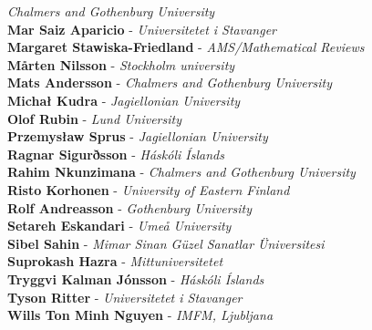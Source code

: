\documentclass[12pt,openany]{report}      %
\begin{document}
\textit{Chalmers and Gothenburg University}
\\
\textbf{Mar Saiz Aparicio} -
\textit{Universitetet i Stavanger}
\\
\textbf{Margaret Stawiska-Friedland} -
\textit{AMS/Mathematical Reviews}
\\
\textbf{Mårten Nilsson} -
\textit{Stockholm university}
\\
\textbf{Mats Andersson} -
\textit{Chalmers and Gothenburg University}
\\
\textbf{Michał Kudra} -
\textit{Jagiellonian University}
\\
\textbf{Olof Rubin} -
\textit{Lund University}
\\
\textbf{Przemysław Sprus} -
\textit{Jagiellonian University}
\\
\textbf{Ragnar Sigurðsson} -
\textit{Háskóli Íslands}
\\
\textbf{Rahim Nkunzimana} -
\textit{Chalmers and Gothenburg University}
\\
\textbf{Risto Korhonen} -
\textit{University of Eastern Finland}
\\
\textbf{Rolf Andreasson} -
\textit{Gothenburg University}
\\
\textbf{Setareh Eskandari} -
\textit{Umeå University}
\\
\textbf{Sibel Sahin} -
\textit{Mimar Sinan Güzel Sanatlar Üniversitesi}
\\
\textbf{Suprokash Hazra} -
\textit{Mittuniversitetet}
\\
\textbf{Tryggvi Kalman Jónsson} -
\textit{Háskóli Íslands}
\\
\textbf{Tyson Ritter} -
\textit{Universitetet i Stavanger}
\\
\textbf{Wills Ton Minh Nguyen} -
\textit{IMFM, Ljubljana}
\restoregeometry

\newpage
\end{document}
